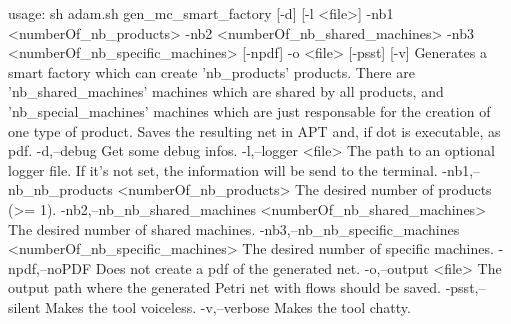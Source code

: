 usage: sh adam.sh gen_mc_smart_factory [-d] [-l <file>] -nb1 <numberOf_nb_products> -nb2
       <numberOf_nb_shared_machines> -nb3 <numberOf_nb_specific_machines> [-npdf] -o <file>
       [-psst] [-v]
Generates a smart factory which can create 'nb_products' products. There
are 'nb_shared_machines' machines which are shared by all products, and
'nb_special_machines' machines which are just responsable for the
creation of one type of product. Saves the resulting net in APT and, if dot is executable, as
pdf.
 -d,--debug                                                       Get some debug infos.
 -l,--logger <file>                                               The path to an optional
                                                                  logger file. If it's not
                                                                  set, the information will be
                                                                  send to the terminal.
 -nb1,--nb_nb_products <numberOf_nb_products>                     The desired number of
                                                                  products (>= 1).
 -nb2,--nb_nb_shared_machines <numberOf_nb_shared_machines>       The desired number of shared
                                                                  machines.
 -nb3,--nb_nb_specific_machines <numberOf_nb_specific_machines>   The desired number of
                                                                  specific machines.
 -npdf,--noPDF                                                    Does not create a pdf of the
                                                                  generated net.
 -o,--output <file>                                               The output path where the
                                                                  generated Petri net with
                                                                  flows should be saved.
 -psst,--silent                                                   Makes the tool voiceless.
 -v,--verbose                                                     Makes the tool chatty.

